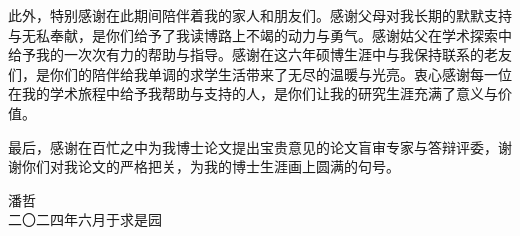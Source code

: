 此外，特别感谢在此期间陪伴着我的家人和朋友们。感谢父母对我长期的默默支持与无私奉献，是你们给予了我读博路上不竭的动力与勇气。感谢姑父在学术探索中给予我的一次次有力的帮助与指导。感谢在这六年硕博生涯中与我保持联系的老友们，是你们的陪伴给我单调的求学生活带来了无尽的温暖与光亮。衷心感谢每一位在我的学术旅程中给予我帮助与支持的人，是你们让我的研究生涯充满了意义与价值。

最后，感谢在百忙之中为我博士论文提出宝贵意见的论文盲审专家与答辩评委，谢谢你们对我论文的严格把关，为我的博士生涯画上圆满的句号。


\begin{flushright}
  潘哲\\
  二〇二四年六月于求是园
\end{flushright}